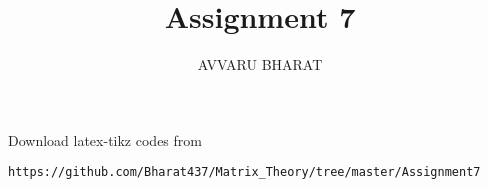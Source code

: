 \documentclass[journal,12pt,twocolumn]{IEEEtran}
\DeclareMathOperator*{\Res}{Res}
\begin{document}
\newtheorem{theorem}{Theorem}[section]
\newtheorem{problem}{Problem}
\newtheorem{proposition}{Proposition}[section]
\newtheorem{lemma}{Lemma}[section]
\newtheorem{corollary}[theorem]{Corollary}
\newtheorem{example}{Example}[section]
\newtheorem{definition}[problem]{Definition}

\newcommand{\BEQA}{\begin{eqnarray}}
\newcommand{\EEQA}{\end{eqnarray}}
\newcommand{\define}{\stackrel{\triangle}{=}}

\providecommand{\mbf}{\mathbf}
\providecommand{\pr}[1]{\ensuremath{\Pr\left(#1\right)}}
\providecommand{\qfunc}[1]{\ensuremath{Q\left(#1\right)}}
\providecommand{\sbrak}[1]{\ensuremath{{}\left[#1\right]}}
\providecommand{\lsbrak}[1]{\ensuremath{{}\left[#1\right.}}
\providecommand{\rsbrak}[1]{\ensuremath{{}\left.#1\right]}}
\providecommand{\brak}[1]{\ensuremath{\left(#1\right)}}
\providecommand{\lbrak}[1]{\ensuremath{\left(#1\right.}}
\providecommand{\rbrak}[1]{\ensuremath{\left.#1\right)}}
\providecommand{\cbrak}[1]{\ensuremath{\left\{#1\right\}}}
\providecommand{\lcbrak}[1]{\ensuremath{\left\{#1\right.}}
\providecommand{\rcbrak}[1]{\ensuremath{\left.#1\right\}}}
\theoremstyle{remark}
\newtheorem{rem}{Remark}
\newcommand{\sgn}{\mathop{\mathrm{sgn}}}
\providecommand{\abs}[1]{\left\vert#1\right\vert}
\providecommand{\res}[1]{\Res\displaylimits_{#1}} 
\providecommand{\norm}[1]{\left\lVert#1\right\rVert}
\providecommand{\mtx}[1]{\mathbf{#1}}
\providecommand{\mean}[1]{E\left[ #1 \right]}
\providecommand{\fourier}{\overset{\mathcal{F}}{ \rightleftharpoons}}
\providecommand{\system}{\overset{\mathcal{H}}{ \longleftrightarrow}}
\newcommand{\solution}{\noindent \textbf{Solution: }}
\newcommand{\cosec}{\,\text{cosec}\,}
\providecommand{\dec}[2]{\ensuremath{\overset{#1}{\underset{#2}{\gtrless}}}}
\newcommand{\myvec}[1]{\ensuremath{\begin{pmatrix}#1\end{pmatrix}}}
\newcommand{\mydet}[1]{\ensuremath{\begin{vmatrix}#1\end{vmatrix}}}
\makeatletter
{}
\makeatother
\let\StandardTheFigure\thefigure
\let\vec\mathbf
\renewcommand{\thefigure}{\theproblem}
\def\putbox#1#2#3{\makebox[0in][l]{\makebox[#1][l]{}\raisebox{\baselineskip}[0in][0in]{\raisebox{#2}[0in][0in]{#3}}}}
     \def\rightbox#1{\makebox[0in][r]{#1}}
     \def\centbox#1{\makebox[0in]{#1}}
     \def\topbox#1{\raisebox{-\baselineskip}[0in][0in]{#1}}
     \def\midbox#1{\raisebox{-0.5\baselineskip}[0in][0in]{#1}}
\vspace{3cm}
\title{Assignment 7}
\author{AVVARU BHARAT}
\maketitle
\newpage
\bigskip
\renewcommand{\thefigure}{1}
\renewcommand{\thetable}{\theenumi}
Download latex-tikz codes from 
%
\begin{lstlisting}
https://github.com/Bharat437/Matrix_Theory/tree/master/Assignment7
\end{lstlisting}
\end{document}
